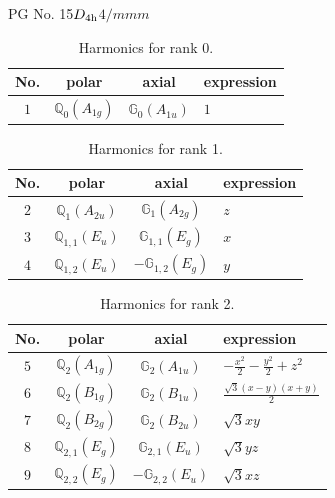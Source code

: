 \documentclass[fleqn,8pt,landscape]{jsarticle}
\begin{document}
\setcounter{MaxMatrixCols}{32}

\renewcommand{\tablename}{Table~}
\renewcommand{\figurename}{Figure~}
\begin{center}
\LARGE
PG No. 15\quad$D_{\rm 4h}$\quad$4/mmm$\quad[ tetragonal ]
\end{center}
\begin{table}[ht!]
\begin{center}
\caption{Harmonics for rank 0.}
\renewcommand{\arraystretch}{1.3}
\begin{tabular}{cccl} \hline \hline
No. & polar & axial & expression \\ \hline
$ 1 $ & $ \mathbb{Q}_{0}(A_{1g}) $ & $ \mathbb{G}_{0}(A_{1u}) $ & $ 1 $ \\
 \hline \hline
\end{tabular}
\end{center}
\end{table}
\begin{table}[ht!]
\begin{center}
\caption{Harmonics for rank 1.}
\renewcommand{\arraystretch}{1.3}
\begin{tabular}{cccl} \hline \hline
No. & polar & axial & expression \\ \hline
$ 2 $ & $ \mathbb{Q}_{1}(A_{2u}) $ & $ \mathbb{G}_{1}(A_{2g}) $ & $ z $ \\
$ 3 $ & $ \mathbb{Q}_{1,1}(E_{u}) $ & $ \mathbb{G}_{1,1}(E_{g}) $ & $ x $ \\
$ 4 $ & $ \mathbb{Q}_{1,2}(E_{u}) $ & $ -\mathbb{G}_{1,2}(E_{g}) $ & $ y $ \\
 \hline \hline
\end{tabular}
\end{center}
\end{table}
\begin{table}[ht!]
\begin{center}
\caption{Harmonics for rank 2.}
\renewcommand{\arraystretch}{1.3}
\begin{tabular}{cccl} \hline \hline
No. & polar & axial & expression \\ \hline
$ 5 $ & $ \mathbb{Q}_{2}(A_{1g}) $ & $ \mathbb{G}_{2}(A_{1u}) $ & $ - \frac{x^{2}}{2} - \frac{y^{2}}{2} + z^{2} $ \\
$ 6 $ & $ \mathbb{Q}_{2}(B_{1g}) $ & $ \mathbb{G}_{2}(B_{1u}) $ & $ \frac{\sqrt{3} \left(x - y\right) \left(x + y\right)}{2} $ \\
$ 7 $ & $ \mathbb{Q}_{2}(B_{2g}) $ & $ \mathbb{G}_{2}(B_{2u}) $ & $ \sqrt{3} x y $ \\
$ 8 $ & $ \mathbb{Q}_{2,1}(E_{g}) $ & $ \mathbb{G}_{2,1}(E_{u}) $ & $ \sqrt{3} y z $ \\
$ 9 $ & $ \mathbb{Q}_{2,2}(E_{g}) $ & $ -\mathbb{G}_{2,2}(E_{u}) $ & $ \sqrt{3} x z $ \\
 \hline \hline
\end{tabular}
\end{center}
\end{table}
\end{document}
